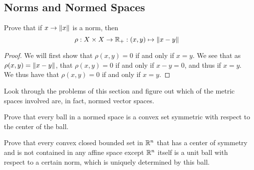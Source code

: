 \subsection{Norms and Normed Spaces}

\begin{minorEx}%
    Prove that if $x \to \Vert x\Vert$ is a norm, then
    \[
        \rho : X \times X \to \mathbb{R}_+ : (x,y) \mapsto \Vert x - y\Vert
    \]
\end{minorEx}

\begin{proof}
  We will first show that $\rho(x,y) =0$ if and only if $x=y$. We see
  that as $\rho(x,y)= \Vert x-y\Vert$, that $\rho(x,y)=0$ if and only if
  $x-y=0$, and thus if $x=y$. We thus have that $\rho(x,y) =0$
  if and only if $x=y$.
\end{proof}

\begin{minorEx}
    Look through the problems of this section and figure out which of the metric
    spaces involved are, in fact, normed vector spaces.
\end{minorEx}

\begin{minorEx}
    Prove that every ball in a normed space is a convex set symmetric with
    respect to the center of the ball.
\end{minorEx}

\begin{minorEx}
    Prove that every convex closed bounded set in $\mathbb{R}^n$ that has a center of
    symmetry and is not contained in any affine space except $\mathbb{R}^n$ itself is a
    unit ball with respect to a certain norm, which is uniquely determined by
    this ball.
\end{minorEx}
